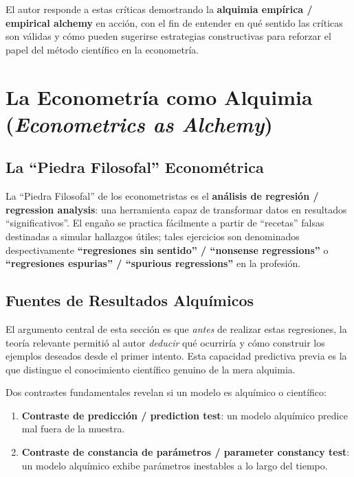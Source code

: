 \documentclass[12pt]{article}
\begin{document}
El autor responde a estas cr\'iticas demostrando la \textbf{alquimia emp\'irica / empirical alchemy} en acci\'on, con el fin de entender en qu\'e sentido las cr\'iticas son v\'alidas y c\'omo pueden sugerirse estrategias constructivas para reforzar el papel del m\'etodo cient\'ifico en la econometr\'ia.

\section{La Econometr\'ia como Alquimia (\textit{Econometrics as Alchemy})}

\subsection{La ``Piedra Filosofal'' Econom\'etrica}

La ``Piedra Filosofal'' de los econometristas es el \textbf{an\'alisis de regresi\'on / regression analysis}: una herramienta capaz de transformar datos en resultados ``significativos''. El enga\~no se practica f\'acilmente a partir de ``recetas'' falsas destinadas a simular hallazgos \'utiles; tales ejercicios son denominados despec\-tivamente \textbf{``regresiones sin sentido'' / ``nonsense regressions''} o \textbf{``regresiones espurias'' / ``spurious regressions''} en la profesi\'on.

\subsection{Fuentes de Resultados Alqu\'imicos}

El argumento central de esta secci\'on es que \textit{antes} de realizar estas regresiones, la teor\'ia relevante permiti\'o al autor \textit{deducir} qu\'e ocurrir\'ia y c\'omo construir los ejemplos deseados desde el primer intento. Esta capacidad predictiva previa es la que distingue el conocimiento cient\'ifico genuino de la mera alquimia.

Dos contrastes fundamentales revelan si un modelo es alqu\'imico o cient\'ifico:
\begin{enumerate}
  \item \textbf{Contraste de predicci\'on / prediction test}: un modelo alqu\'imico predice mal fuera de la muestra.
  \item \textbf{Contraste de constancia de par\'ametros / parameter constancy test}: un modelo alqu\'imico exhibe par\'ametros inestables a lo largo del tiempo.
\end{enumerate}
\end{document}
